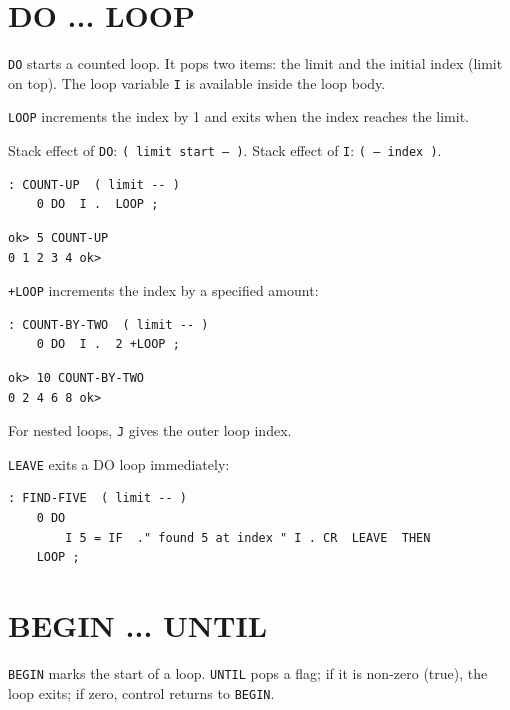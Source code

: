 \section{DO ... LOOP}
\label{sec:do-loop}

\texttt{DO} starts a counted loop. It pops two items: the limit and the
initial index (limit on top). The loop variable \texttt{I} is available inside
the loop body.

\texttt{LOOP} increments the index by 1 and exits when the index reaches the
limit.

Stack effect of \texttt{DO}: \texttt{( limit start -- )}.
Stack effect of \texttt{I}: \texttt{( -- index )}.

\begin{lstlisting}[language=Forth]
: COUNT-UP  ( limit -- )
    0 DO  I .  LOOP ;
\end{lstlisting}

\begin{lstlisting}[language=Forth]
ok> 5 COUNT-UP
0 1 2 3 4 ok>
\end{lstlisting}

\texttt{+LOOP} increments the index by a specified amount:

\begin{lstlisting}[language=Forth]
: COUNT-BY-TWO  ( limit -- )
    0 DO  I .  2 +LOOP ;
\end{lstlisting}

\begin{lstlisting}[language=Forth]
ok> 10 COUNT-BY-TWO
0 2 4 6 8 ok>
\end{lstlisting}

For nested loops, \texttt{J} gives the outer loop index.

\texttt{LEAVE} exits a DO loop immediately:

\begin{lstlisting}[language=Forth]
: FIND-FIVE  ( limit -- )
    0 DO
        I 5 = IF  ." found 5 at index " I . CR  LEAVE  THEN
    LOOP ;
\end{lstlisting}

\section{BEGIN ... UNTIL}
\label{sec:begin-until}

\texttt{BEGIN} marks the start of a loop. \texttt{UNTIL} pops a flag; if it
is non-zero (true), the loop exits; if zero, control returns to \texttt{BEGIN}.

